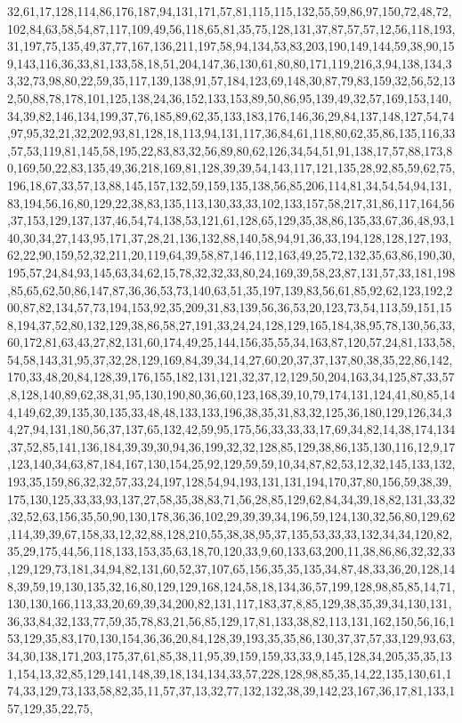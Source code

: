 \documentclass[11pt]{article}
\begin{document}
\begin{vncode}
32,61,17,128,114,86,176,187,94,131,171,57,81,115,115,132,55,59,86,97,150,72,48,72,102,84,63,58,54,87,117,109,49,56,118,65,81,35,75,128,131,37,87,57,57,12,56,118,193,31,197,75,135,49,37,77,167,136,211,197,58,94,134,53,83,203,190,149,144,59,38,90,159,143,116,36,33,81,133,58,18,51,204,147,36,130,61,80,80,171,119,216,3,94,138,134,33,32,73,98,80,22,59,35,117,139,138,91,57,184,123,69,148,30,87,79,83,159,32,56,52,132,50,88,78,178,101,125,138,24,36,152,133,153,89,50,86,95,139,49,32,57,169,153,140,34,39,82,146,134,199,37,76,185,89,62,35,133,183,176,146,36,29,84,137,148,127,54,74,97,95,32,21,32,202,93,81,128,18,113,94,131,117,36,84,61,118,80,62,35,86,135,116,33,57,53,119,81,145,58,195,22,83,83,32,56,89,80,62,126,34,54,51,91,138,17,57,88,173,80,169,50,22,83,135,49,36,218,169,81,128,39,39,54,143,117,121,135,28,92,85,59,62,75,196,18,67,33,57,13,88,145,157,132,59,159,135,138,56,85,206,114,81,34,54,54,94,131,83,194,56,16,80,129,22,38,83,135,113,130,33,33,102,133,157,58,217,31,86,117,164,56,37,153,129,137,137,46,54,74,138,53,121,61,128,65,129,35,38,86,135,33,67,36,48,93,140,30,34,27,143,95,171,37,28,21,136,132,88,140,58,94,91,36,33,194,128,128,127,193,62,22,90,159,52,32,211,20,119,64,39,58,87,146,112,163,49,25,72,132,35,63,86,190,30,195,57,24,84,93,145,63,34,62,15,78,32,32,33,80,24,169,39,58,23,87,131,57,33,181,198,85,65,62,50,86,147,87,36,36,53,73,140,63,51,35,197,139,83,56,61,85,92,62,123,192,200,87,82,134,57,73,194,153,92,35,209,31,83,139,56,36,53,20,123,73,54,113,59,151,158,194,37,52,80,132,129,38,86,58,27,191,33,24,24,128,129,165,184,38,95,78,130,56,33,60,172,81,63,43,27,82,131,60,174,49,25,144,156,35,55,34,163,87,120,57,24,81,133,58,54,58,143,31,95,37,32,28,129,169,84,39,34,14,27,60,20,37,37,137,80,38,35,22,86,142,170,33,48,20,84,128,39,176,155,182,131,121,32,37,12,129,50,204,163,34,125,87,33,57,8,128,140,89,62,38,31,95,130,190,80,36,60,123,168,39,10,79,174,131,124,41,80,85,144,149,62,39,135,30,135,33,48,48,133,133,196,38,35,31,83,32,125,36,180,129,126,34,34,27,94,131,180,56,37,137,65,132,42,59,95,175,56,33,33,33,17,69,34,82,14,38,174,134,37,52,85,141,136,184,39,39,30,94,36,199,32,32,128,85,129,38,86,135,130,116,12,9,17,123,140,34,63,87,184,167,130,154,25,92,129,59,59,10,34,87,82,53,12,32,145,133,132,193,35,159,86,32,32,57,33,24,197,128,54,94,193,131,131,194,170,37,80,156,59,38,39,175,130,125,33,33,93,137,27,58,35,38,83,71,56,28,85,129,62,84,34,39,18,82,131,33,32,32,52,63,156,35,50,90,130,178,36,36,102,29,39,39,34,196,59,124,130,32,56,80,129,62,114,39,39,67,158,33,12,32,88,128,210,55,38,38,95,37,135,53,33,33,132,34,34,120,82,35,29,175,44,56,118,133,153,35,63,18,70,120,33,9,60,133,63,200,11,38,86,86,32,32,33,129,129,73,181,34,94,82,131,60,52,37,107,65,156,35,35,135,34,87,48,33,36,20,128,148,39,59,19,130,135,32,16,80,129,129,168,124,58,18,134,36,57,199,128,98,85,85,14,71,130,130,166,113,33,20,69,39,34,200,82,131,117,183,37,8,85,129,38,35,39,34,130,131,36,33,84,32,133,77,59,35,78,83,21,56,85,129,17,81,133,38,82,113,131,162,150,56,16,153,129,35,83,170,130,154,36,36,20,84,128,39,193,35,35,86,130,37,37,57,33,129,93,63,34,30,138,171,203,175,37,61,85,38,11,95,39,159,159,33,33,9,145,128,34,205,35,35,131,154,13,32,85,129,141,148,39,18,134,134,33,57,228,128,98,85,35,14,22,135,130,61,174,33,129,73,133,58,82,35,11,57,37,13,32,77,132,132,38,39,142,23,167,36,17,81,133,157,129,35,22,75,
\end{vncode}
\end{document}
